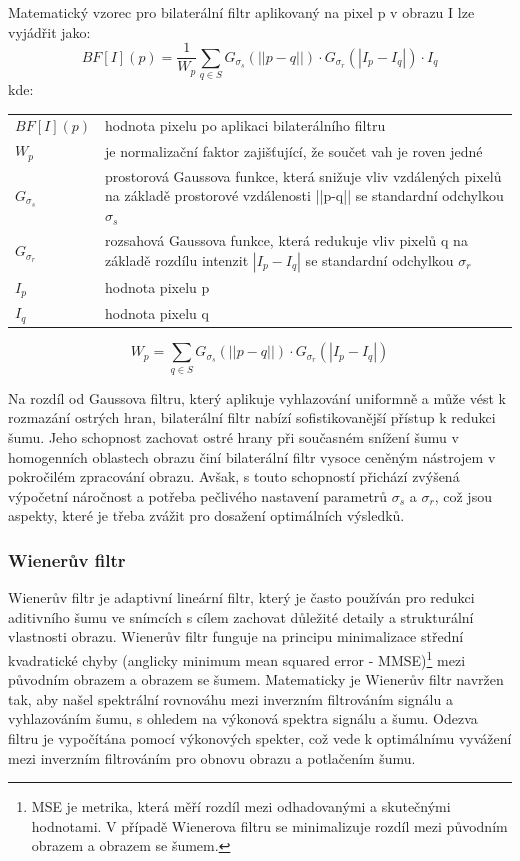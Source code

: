 \documentclass[male,czech,api_ing]{thesis}
\makeatletter
\newenvironment{conditions}[1][kde:]
    {#1 \begin{tabular}[t]{>{$}l<{$} @{${}={}$} >{\raggedright\arraybackslash}p{10cm}}}
    {\end{tabular}}
\makeatother
\begin{document}
Matematický vzorec pro bilaterální filtr aplikovaný na pixel p v obrazu I lze vyjádřit jako:
\begin{equation}
    BF[I](p) = \frac{1}{W_p} \sum_{q \in S} G_{\sigma_s}(||p-q||) \cdot G_{\sigma_r}(|I_p - I_q|) \cdot I_q
\end{equation}
\begin{conditions}
    BF[I](p) & hodnota pixelu po aplikaci bilaterálního filtru \\
    W_p & je normalizační faktor zajišťující, že součet vah je roven jedné \\
    G_{\sigma_s} & prostorová Gaussova funkce, která snižuje vliv vzdálených pixelů na základě prostorové vzdálenosti ||p-q|| se standardní odchylkou $\sigma_s$ \\
    G_{\sigma_r} & rozsahová Gaussova funkce, která redukuje vliv pixelů q na základě rozdílu intenzit $|I_p-I_q|$ se standardní odchylkou $\sigma_r$ \\
    I_p & hodnota pixelu p \\
    I_q & hodnota pixelu q \\
\end{conditions}

\begin{equation}
    W_p = \sum_{q \in S} G_{\sigma_s}(||p-q||) \cdot G_{\sigma_r}(|I_p - I_q|)
\end{equation}

Na rozdíl od Gaussova filtru, který aplikuje vyhlazování uniformně a může vést k rozmazání ostrých hran, bilaterální filtr nabízí sofistikovanější přístup k redukci šumu. Jeho schopnost zachovat ostré hrany při současném snížení šumu v homogenních oblastech obrazu činí bilaterální filtr vysoce ceněným nástrojem v pokročilém zpracování obrazu. Avšak, s touto schopností přichází zvýšená výpočetní náročnost a potřeba pečlivého nastavení parametrů $\sigma_s$ a $\sigma_r$, což jsou aspekty, které je třeba zvážit pro dosažení optimálních výsledků. \cite{BilateralFilter}

\subsubsection{Wienerův filtr}
Wienerův filtr je adaptivní lineární filtr, který je často používán pro redukci aditivního šumu ve snímcích s cílem zachovat důležité detaily a strukturální vlastnosti obrazu. Wienerův filtr funguje na principu minimalizace střední kvadratické chyby (anglicky minimum mean squared error - MMSE)\footnote{MSE je metrika, která měří rozdíl mezi odhadovanými a skutečnými hodnotami. V případě Wienerova filtru se minimalizuje rozdíl mezi původním obrazem a obrazem se šumem.} mezi původním obrazem a obrazem se šumem. Matematicky je Wienerův filtr navržen tak, aby našel spektrální rovnováhu mezi inverzním filtrováním signálu a vyhlazováním šumu, s ohledem na výkonová spektra signálu a šumu. Odezva filtru je vypočítána pomocí výkonových spekter, což vede k optimálnímu vyvážení mezi inverzním filtrováním pro obnovu obrazu a potlačením šumu.
\end{document}
